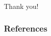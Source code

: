 \documentclass{beamer}
\begin{document}
\begin{frame}
\begin{center}
\Huge Thank you!
\end{center}
\end{frame}
\begin{frame}[allowframebreaks]
\frametitle{References}
 

\end{frame}
\end{document}
